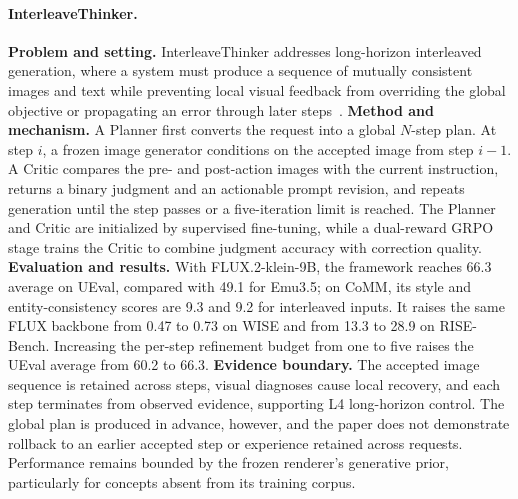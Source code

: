 \paragraph{InterleaveThinker.}
\textbf{Problem and setting.} InterleaveThinker addresses long-horizon interleaved generation, where a system must produce a sequence of mutually consistent images and text while preventing local visual feedback from overriding the global objective or propagating an error through later steps~\cite{avg260613679}. \textbf{Method and mechanism.} A Planner first converts the request into a global $N$-step plan. At step $i$, a frozen image generator conditions on the accepted image from step $i-1$. A Critic compares the pre- and post-action images with the current instruction, returns a binary judgment and an actionable prompt revision, and repeats generation until the step passes or a five-iteration limit is reached. The Planner and Critic are initialized by supervised fine-tuning, while a dual-reward GRPO stage trains the Critic to combine judgment accuracy with correction quality. \textbf{Evaluation and results.} With FLUX.2-klein-9B, the framework reaches 66.3 average on UEval, compared with 49.1 for Emu3.5; on CoMM, its style and entity-consistency scores are 9.3 and 9.2 for interleaved inputs. It raises the same FLUX backbone from 0.47 to 0.73 on WISE and from 13.3 to 28.9 on RISE-Bench. Increasing the per-step refinement budget from one to five raises the UEval average from 60.2 to 66.3. \textbf{Evidence boundary.} The accepted image sequence is retained across steps, visual diagnoses cause local recovery, and each step terminates from observed evidence, supporting L4 long-horizon control. The global plan is produced in advance, however, and the paper does not demonstrate rollback to an earlier accepted step or experience retained across requests. Performance remains bounded by the frozen renderer's generative prior, particularly for concepts absent from its training corpus.

